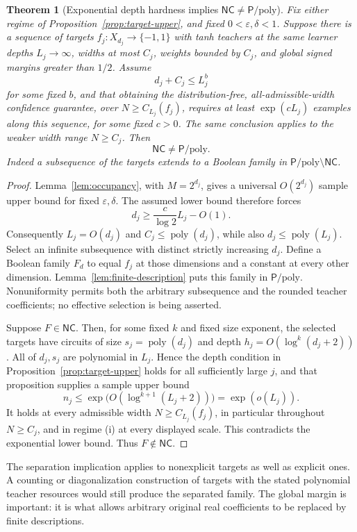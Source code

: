 \documentclass[11pt]{article}
\newtheorem{theorem}{Theorem}[section]
\theoremstyle{remark}
\newcommand{\poly}{\operatorname{poly}}
\newcommand{\NC}{\mathsf{NC}}
\newcommand{\Ppoly}{\mathsf{P}/\mathrm{poly}}
\begin{document}
\begin{theorem}[Exponential depth hardness implies $\NC\ne\Ppoly$]
\label{thm:exp-barrier}
Fix either regime of Proposition~\ref{prop:target-upper}, and fixed
$0<\varepsilon,\delta<1$. Suppose there is a sequence of targets
$f_j:X_{d_j}\to\{-1,1\}$ with tanh teachers at the same learner
depths $L_j\to\infty$, widths at most $C_j$, weights bounded by
$C_j$, and global signed margins greater than $1/2$. Assume
\[
 d_j+C_j\le L_j^b
\]
for some fixed $b$, and that obtaining the distribution-free,
all-admissible-width confidence guarantee, over $N\ge C_{L_j}(f_j)$,
requires at least
$\exp(cL_j)$ examples along this sequence, for some fixed $c>0$.
The same conclusion applies to the weaker width range $N\ge C_j$.
Then
\[
 \boxed{\qquad\NC\ne\Ppoly.\qquad}
\]
Indeed a subsequence of the targets extends to a Boolean family in
$\Ppoly\setminus\NC$.
\end{theorem}
\begin{proof}
Lemma~\ref{lem:occupancy}, with $M=2^{d_j}$, gives a universal
$O(2^{d_j})$ sample upper bound for fixed $\varepsilon,\delta$.
The assumed lower bound therefore forces
\[
 d_j\ge\frac c{\log2}L_j-O(1).
\]
Consequently $L_j=O(d_j)$ and $C_j\le\poly(d_j)$, while also
$d_j\le\poly(L_j)$. Select an infinite subsequence with distinct
strictly increasing $d_j$. Define a Boolean family $F_d$ to equal
$f_j$ at those dimensions and a constant at every other dimension.
Lemma~\ref{lem:finite-description} puts this family in $\Ppoly$.
Nonuniformity permits both the arbitrary subsequence and the rounded
teacher coefficients; no effective selection is being asserted.

Suppose $F\in\NC$. Then, for some fixed $k$ and fixed size exponent,
the selected targets have circuits of size $s_j=\poly(d_j)$ and
depth $h_j=O(\log^k(d_j+2))$. All of $d_j,s_j$ are polynomial in
$L_j$. Hence the depth condition in
Proposition~\ref{prop:target-upper} holds for all sufficiently large
$j$, and that proposition supplies a sample upper bound
\[
 n_j\le
 \exp\bigl(O(\log^{k+1}(L_j+2))\bigr)
 =\exp(o(L_j)).
\]
It holds at every admissible width $N\ge C_{L_j}(f_j)$, in particular
throughout $N\ge C_j$, and in regime (i) at every displayed scale. This
contradicts the exponential lower bound. Thus $F\notin\NC$.
\end{proof}

The separation implication applies to nonexplicit targets as well as
explicit ones. A counting or diagonalization construction of targets
with the stated polynomial teacher resources would still produce the
separated family. The global margin is important: it is what allows
arbitrary original real coefficients to be replaced by finite
descriptions.
\end{document}
